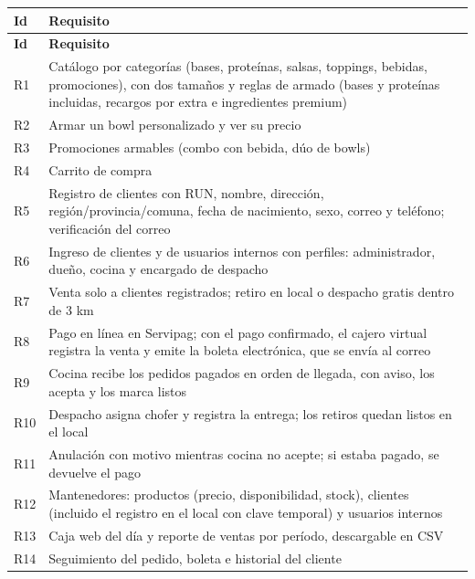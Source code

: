 {\small
\setlength{\tabcolsep}{3pt}\renewcommand{\arraystretch}{1.15}
\begin{longtable}{|>{\raggedright\arraybackslash}p{}|>{\raggedright\arraybackslash}p{}|}
\hline
\textbf{Id} & \textbf{Requisito} \\ \hline
\endfirsthead
\hline
\textbf{Id} & \textbf{Requisito} \\ \hline
\endhead
R1 & Catálogo por categorías (bases, proteínas, salsas, toppings, bebidas, promociones), con dos tamaños y reglas de armado (bases y proteínas incluidas, recargos por extra e ingredientes premium) \\ \hline
R2 & Armar un bowl personalizado y ver su precio \\ \hline
R3 & Promociones armables (combo con bebida, dúo de bowls) \\ \hline
R4 & Carrito de compra \\ \hline
R5 & Registro de clientes con RUN, nombre, dirección, región/provincia/comuna, fecha de nacimiento, sexo, correo y teléfono; verificación del correo \\ \hline
R6 & Ingreso de clientes y de usuarios internos con perfiles: administrador, dueño, cocina y encargado de despacho \\ \hline
R7 & Venta solo a clientes registrados; retiro en local o despacho gratis dentro de 3 km \\ \hline
R8 & Pago en línea en Servipag; con el pago confirmado, el cajero virtual registra la venta y emite la boleta electrónica, que se envía al correo \\ \hline
R9 & Cocina recibe los pedidos pagados en orden de llegada, con aviso, los acepta y los marca listos \\ \hline
R10 & Despacho asigna chofer y registra la entrega; los retiros quedan listos en el local \\ \hline
R11 & Anulación con motivo mientras cocina no acepte; si estaba pagado, se devuelve el pago \\ \hline
R12 & Mantenedores: productos (precio, disponibilidad, stock), clientes (incluido el registro en el local con clave temporal) y usuarios internos \\ \hline
R13 & Caja web del día y reporte de ventas por período, descargable en CSV \\ \hline
R14 & Seguimiento del pedido, boleta e historial del cliente \\ \hline
\end{longtable}
}

